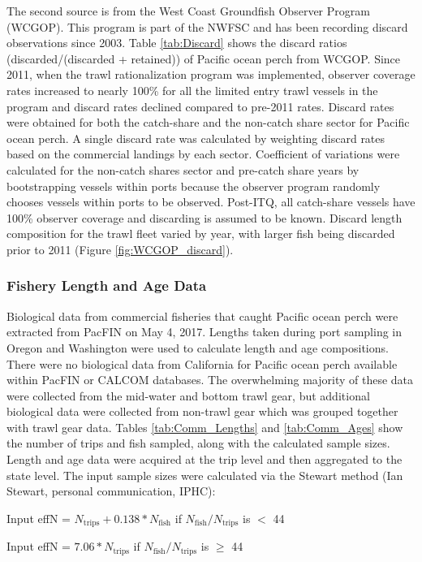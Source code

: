 \documentclass[12pt,]{article}
\begin{document}
The second source is from the West Coast Groundfish Observer Program
(WCGOP). This program is part of the NWFSC and has been recording
discard observations since 2003. Table \ref{tab:Discard} shows the
discard ratios (discarded/(discarded + retained)) of Pacific ocean perch
from WCGOP. Since 2011, when the trawl rationalization program was
implemented, observer coverage rates increased to nearly 100\% for all
the limited entry trawl vessels in the program and discard rates
declined compared to pre-2011 rates. Discard rates were obtained for
both the catch-share and the non-catch share sector for Pacific ocean
perch. A single discard rate was calculated by weighting discard rates
based on the commercial landings by each sector. Coefficient of
variations were calculated for the non-catch shares sector and pre-catch
share years by bootstrapping vessels within ports because the observer
program randomly chooses vessels within ports to be observed. Post-ITQ,
all catch-share vessels have 100\% observer coverage and discarding is
assumed to be known. Discard length composition for the trawl fleet
varied by year, with larger fish being discarded prior to 2011 (Figure
\ref{fig:WCGOP_discard}).

\subsubsection{Fishery Length and Age
Data}\label{fishery-length-and-age-data}

Biological data from commercial fisheries that caught Pacific ocean
perch were extracted from PacFIN on May 4, 2017. Lengths taken during
port sampling in Oregon and Washington were used to calculate length and
age compositions. There were no biological data from California for
Pacific ocean perch available within PacFIN or CALCOM databases. The
overwhelming majority of these data were collected from the mid-water
and bottom trawl gear, but additional biological data were collected
from non-trawl gear which was grouped together with trawl gear data.
Tables \ref{tab:Comm_Lengths} and \ref{tab:Comm_Ages} show the number of
trips and fish sampled, along with the calculated sample sizes. Length
and age data were acquired at the trip level and then aggregated to the
state level. The input sample sizes were calculated via the Stewart
method (Ian Stewart, personal communication, IPHC):

\begin{centering}

Input effN = $N_{\text{trips}} + 0.138 * N_{\text{fish}}$ if $N_{\text{fish}}/N_{\text{trips}}$ is $<$ 44

Input effN = $7.06 * N_{\text{trips}}$ if $N_{\text{fish}}/N_{\text{trips}}$ is $\geq$ 44

\end{centering}
\end{document}
